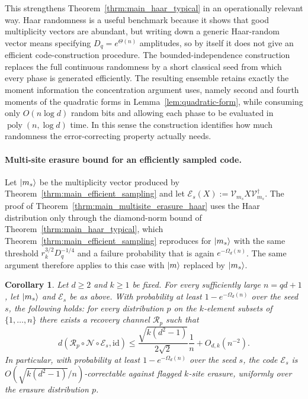 \documentclass[10pt,twocolumn,superscriptaddress,aps,amsmath,amssymb,citeautoscript,floatfix,prx]{revtex4-2}
\newtheorem{corollary}{Corollary}
\theoremstyle{plain}
\theoremstyle{plain}
\theoremstyle{plain}
\theoremstyle{plain}
\theoremstyle{plain}
\theoremstyle{plain}
\theoremstyle{plain}
\theoremstyle{definition}
\theoremstyle{plain}
\begin{document}
This strengthens Theorem~\ref{thrm:main_haar_typical} in an operationally relevant way. 
Haar randomness is a useful benchmark because it shows that good multiplicity vectors are abundant, but writing down a generic Haar-random vector means specifying $D_q=e^{\Theta(n)}$ amplitudes, 
so by itself it does not give an efficient code-construction procedure. 
The bounded-independence construction replaces the full continuous randomness by a short classical seed from which every phase is generated efficiently. 
The resulting ensemble retains exactly the moment information the concentration argument uses, namely second and fourth moments of the quadratic forms in Lemma~\ref{lem:quadratic-form}, 
while consuming only $O(n\log d)$ random bits and allowing each phase to be evaluated in $\operatorname{poly}(n,\log d)$ time. 
In this sense the construction identifies how much randomness the error-correcting property actually needs.

\paragraph{Multi-site erasure bound for an efficiently sampled code.}

Let $\ket{m_s}$ be the multiplicity vector produced by Theorem~\ref{thrm:main_efficient_sampling} and let $\mathcal E_s(X):=\mathcal{V}_{m_s}X\mathcal{V}_{m_s}^\dagger$. 
The proof of Theorem~\ref{thrm:main_multisite_erasure_haar} uses the Haar distribution only through the diamond-norm bound of Theorem~\ref{thrm:main_haar_typical}, 
which Theorem~\ref{thrm:main_efficient_sampling} reproduces for $\ket{m_s}$ with the same threshold $r_k^{3/2}D_q^{-1/4}$ and a failure probability that
is again $e^{-\Omega_d(n)}$. The same argument therefore applies to this case with $\ket m$ replaced by $\ket{m_s}$.

\begin{corollary}\label{thrm:main_multisite_erasure}
Let $d\ge2$ and $k\ge1$ be fixed. For every sufficiently large $n=qd+1$, let $\ket{m_s}$ and $\mathcal E_s$ be as above. 
With probability at least $1-e^{-\Omega_d(n)}$ over the seed $s$, the following holds: for every distribution $p$ on the $k$-element subsets of 
$\{1,\ldots,n\}$ there exists a recovery channel $\mathcal R_p$ such that
$$
d\left(
\mathcal R_p\circ\mathcal N\circ\mathcal E_s,
\mathrm{id}
\right)
\le
\frac{\sqrt{k(d^2-1)}}{2\sqrt2}
\frac1n
+
O_{d,k}(n^{-2}).
$$
In particular, with probability at least $1-e^{-\Omega_d(n)}$ over the seed $s$, the code $\mathcal E_s$ is $O(\sqrt{k(d^2-1)}/n)$-correctable against flagged $k$-site erasure, 
uniformly over the erasure distribution $p$.
\end{corollary}
\end{document}
